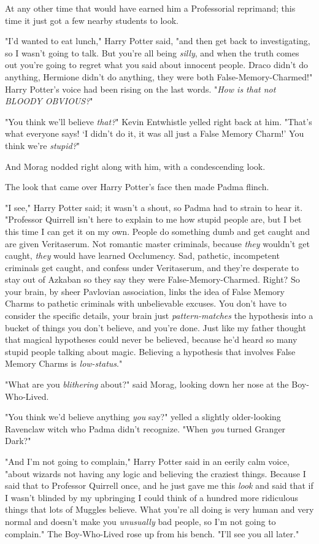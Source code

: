 At any other time that would have earned him a Professorial reprimand; this time
it just got a few nearby students to look.

"I'd wanted to eat lunch," Harry Potter said, "and then get back to
investigating, so I wasn't going to talk. But you're all being \emph{silly},
and when the truth comes out you're going to regret what you said about
innocent people. Draco didn't do anything, Hermione didn't do anything, they
were both False-Memory-Charmed!" Harry Potter's voice had been rising on the
last words. "\emph{How is that not BLOODY OBVIOUS?}"

"You think we'll believe \emph{that?}" Kevin Entwhistle yelled right back at
him. "That's what everyone says! `I didn't do it, it was all just a False
Memory Charm!' You think we're \emph{stupid?}"

And Morag nodded right along with him, with a condescending look.

The look that came over Harry Potter's face then made Padma flinch.

"I see," Harry Potter said; it wasn't a shout, so Padma had to strain to hear
it. "Professor Quirrell isn't here to explain to me how stupid people are, but
I bet this time I can get it on my own. People do something dumb and get caught
and are given Veritaserum. Not romantic master criminals, because \emph{they}
wouldn't get caught, \emph{they} would have learned Occlumency. Sad, pathetic,
incompetent criminals get caught, and confess under Veritaserum, and they're
desperate to stay out of Azkaban so they say they were False-Memory-Charmed.
Right? So your brain, by sheer Pavlovian association, links the idea of False
Memory Charms to pathetic criminals with unbelievable excuses. You don't have
to consider the specific details, your brain just \emph{pattern-matches} the
hypothesis into a bucket of things you don't believe, and you're done. Just
like my father thought that magical hypotheses could never be believed, because
he'd heard so many stupid people talking about magic. Believing a hypothesis
that involves False Memory Charms is \emph{low-status}."

"What are you \emph{blithering} about?" said Morag, looking down her nose at
the Boy-Who-Lived.

"You think we'd believe anything \emph{you} say?" yelled a slightly
older-looking Ravenclaw witch who Padma didn't recognize. "When \emph{you}
turned Granger Dark?"

"And I'm not going to complain," Harry Potter said in an eerily calm voice,
"about wizards not having any logic and believing the craziest things. Because
I said that to Professor Quirrell once, and he just gave me this \emph{look}
and said that if I wasn't blinded by my upbringing I could think of a hundred
more ridiculous things that lots of Muggles believe. What you're all doing is
very human and very normal and doesn't make you \emph{unusually} bad people, so
I'm not going to complain." The Boy-Who-Lived rose up from his bench. "I'll see
you all later."

